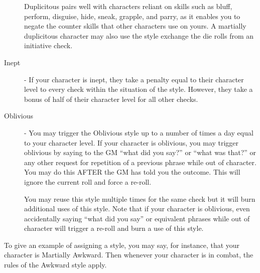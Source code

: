 \begin{description}
Duplicitous pairs well with characters reliant on skills such as bluff, perform, disguise, hide, sneak, grapple, and parry, as it enables you to negate the counter skills that other characters use on yours. A martially duplicitous character may also use the style exchange the die rolls from an initiative check.
\item[Inept] - If your character is inept, they take a penalty equal to their character level to every check within the situation of the style. However, they take a bonus of half of their character level for all other checks.
\item[Oblivious] - You may trigger the Oblivious style up to a number of times a day equal to your character level. If your character is oblivious, you may trigger oblivious by saying to the GM “what did you say?” or “what was that?” or any other request for repetition of a previous phrase while out of character. You may do this AFTER the GM has told you the outcome. This will ignore the current roll and force a re-roll.

You may reuse this style multiple times for the same check but it will burn additional uses of this style. Note that if your character is oblivious, even accidentally saying “what did you say” or equivalent phrases while out of character will trigger a re-roll and burn a use of this style.
\end{description}

To give an example of assigning a style, you may say, for instance, that your character is Martially Awkward. Then whenever your character is in combat, the rules of the Awkward style apply.
